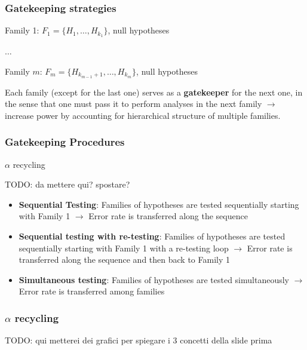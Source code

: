 \documentclass[xcolor={dvipsnames}]{beamer}
\newcommand{\rbf}[1]{\textcolor{redUnipd}{ #1}}
\begin{document}
\begin{frame}
\frametitle{Gatekeeping strategies}
\rbf{Family 1}:
$F_1 = \{H_1, \dots, H_{k_1}\}$, null hypotheses

$\dots$

\rbf{Family $m$}:
$F_m = \{H_{k_{m-1} +1}, \dots, H_{k_m}\}$, null hypotheses

\bigskip

Each family (except for the last one) serves as a \textbf{gatekeeper} for the next one, in the sense that one must pass it to perform analyses in the next family $\rightarrow$ increase power by accounting for \rbf{hierarchical} structure of multiple families.
\end{frame}

\begin{frame}
\frametitle{Gatekeeping Procedures}

\rbf{$\alpha$ recycling}

TODO: da mettere qui? spostare?

\begin{itemize}
    \item \textbf{Sequential Testing}: Families of hypotheses are tested sequentially starting with Family 1 $\rightarrow$ Error rate is transferred along the sequence
    \item \textbf{Sequential testing with re-testing}: Families of hypotheses are tested sequentially starting with Family 1 with a re-testing loop $\rightarrow$ Error rate is transferred along the sequence and then back to Family 1
    \item \textbf{Simultaneous testing}: Families of hypotheses are tested simultaneously $\rightarrow$ Error rate is transferred among families
\end{itemize}

    
\end{frame}

\begin{frame}
\frametitle{$\alpha$ recycling}

TODO: qui metterei dei grafici per spiegare i 3 concetti della slide prima
\end{frame}
\end{document}
